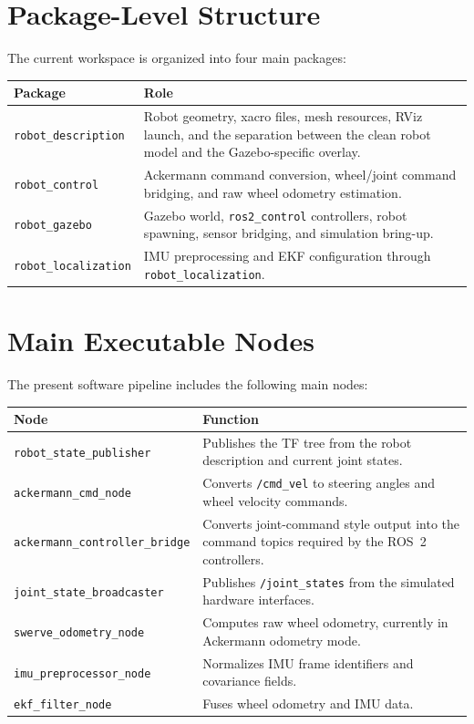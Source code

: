 \documentclass[12pt,a4paper]{report}
\begin{document}
\section{Package-Level Structure}
The current workspace is organized into four main packages:
\begin{longtable}{>{\raggedright\arraybackslash}p{} >{\raggedright\arraybackslash}p{}}
\toprule
\textbf{Package} & \textbf{Role} \\
\midrule
\endhead
\texttt{robot\_description} & Robot geometry, xacro files, mesh resources, RViz launch, and the separation between the clean robot model and the Gazebo-specific overlay. \\
\texttt{robot\_control} & Ackermann command conversion, wheel/joint command bridging, and raw wheel odometry estimation. \\
\texttt{robot\_gazebo} & Gazebo world, \texttt{ros2\_control} controllers, robot spawning, sensor bridging, and simulation bring-up. \\
\texttt{robot\_localization} & IMU preprocessing and EKF configuration through \texttt{robot\_localization}. \\
\bottomrule
\end{longtable}

\section{Main Executable Nodes}
The present software pipeline includes the following main nodes:
\begin{longtable}{>{\raggedright\arraybackslash}p{} >{\raggedright\arraybackslash}p{}}
\toprule
\textbf{Node} & \textbf{Function} \\
\midrule
\endhead
\texttt{robot\_state\_publisher} & Publishes the TF tree from the robot description and current joint states. \\
\texttt{ackermann\_cmd\_node} & Converts \texttt{/cmd\_vel} to steering angles and wheel velocity commands. \\
\texttt{ackermann\_controller\_bridge} & Converts joint-command style output into the command topics required by the ROS~2 controllers. \\
\texttt{joint\_state\_broadcaster} & Publishes \texttt{/joint\_states} from the simulated hardware interfaces. \\
\texttt{swerve\_odometry\_node} & Computes raw wheel odometry, currently in Ackermann odometry mode. \\
\texttt{imu\_preprocessor\_node} & Normalizes IMU frame identifiers and covariance fields. \\
\texttt{ekf\_filter\_node} & Fuses wheel odometry and IMU data. \\
\bottomrule
\end{longtable}
\end{document}
